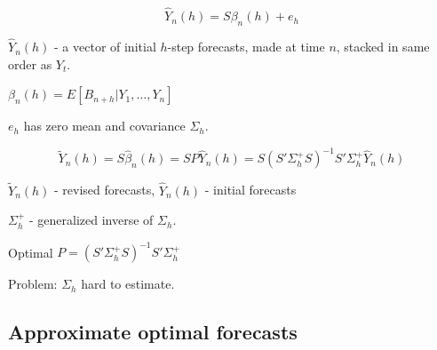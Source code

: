 \documentclass[c, dvipsnames]{beamer}  %
\begin{document}
\begin{frame}[shrink=5]
\frametitle{\insertsection} 
\framesubtitle{\insertsubsection}

\[ \hat{Y}_n ( h ) = S \beta_n ( h ) + e_h  \]

$ \hat{Y}_n ( h ) $ - a vector of initial $ h $-step forecasts,
made at time $ n $, stacked in same order as $ Y_t  $.

$ \beta_n ( h )   = E [ B _{n + h} | Y_1 , \dots , Y_n ]  $

$ e_h  $  has zero mean and covariance $ \Sigma_h  $.

\[ \tilde{Y}_n ( h )
= S \hat{\beta}_n ( h ) = S P  \hat{Y}_n ( h ) =  S ( S' \Sigma^{+}_h S )^{-1}  S'  \Sigma^{+}_h  \hat{Y}_n ( h )
 \]
 
$ \tilde{Y}_n ( h ) $   - revised forecasts, 
$ \hat{Y}_n ( h ) $ - initial forecasts

$ \Sigma^{+}_h $ - generalized inverse of $ \Sigma_h $.

Optimal $ P = ( S' \Sigma^{+}_h S )^{-1}  S'  \Sigma^{+}_h  $

Problem: $ \Sigma_h $ hard to estimate.

\end{frame}



\subsection{Approximate optimal forecasts}
\end{document}

